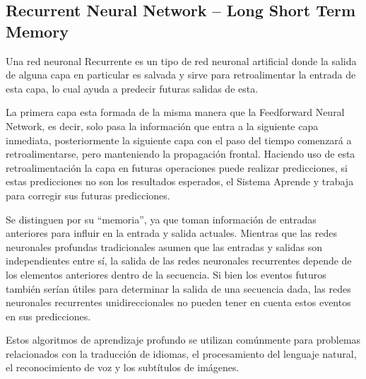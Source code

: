 \documentclass[12pt, a4paper, titlepage]{report}
\begin{document}
				\subsection{Recurrent Neural Network – Long Short Term Memory}
				Una red neuronal \Gls{Recurrente} es un tipo de red neuronal artificial donde la salida de alguna capa en particular es salvada y sirve para retroalimentar la entrada de esta capa, lo cual ayuda a predecir futuras salidas de esta.\par
				La primera capa esta formada de la misma manera que la Feedforward Neural Network, es decir, solo pasa la información que entra a la siguiente capa inmediata, posteriormente la siguiente capa con el paso del tiempo comenzará a retroalimentarse, pero manteniendo la propagación frontal. Haciendo uso de esta retroalimentación la capa en futuras operaciones puede realizar predicciones, si estas predicciones no son los resultados esperados, el \Gls{Sistema} \Gls{Aprende} y trabaja para corregir sus futuras predicciones.\cite{refTiposRedesNeu1}\par
				Se distinguen por su “memoria”, ya que toman información de entradas anteriores para influir en la entrada y salida actuales. Mientras que las redes neuronales profundas tradicionales asumen que las entradas y salidas son independientes entre sí, la salida de las redes neuronales recurrentes depende de los elementos anteriores dentro de la secuencia. Si bien los eventos futuros también serían útiles para determinar la salida de una secuencia dada, las redes neuronales recurrentes unidireccionales no pueden tener en cuenta estos eventos en sus predicciones.\cite{refTiposRedesNeu4}\par
				Estos algoritmos de aprendizaje profundo se utilizan comúnmente para problemas relacionados con la traducción de idiomas, el procesamiento del lenguaje natural, el reconocimiento de voz y los subtítulos de imágenes.
				\newpage
\end{document}
